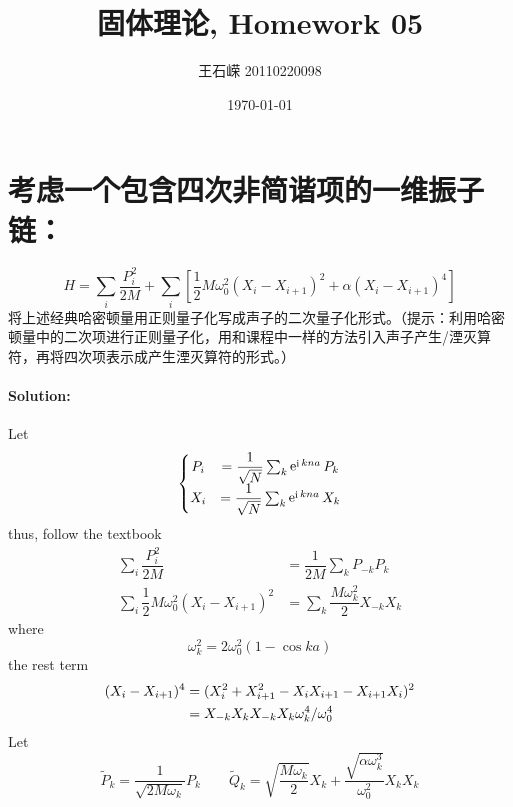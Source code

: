 \documentclass[a4paper]{article}
\title{固体理论, Homework 05}
\author{王石嵘 20110220098}
\date{\today} %
\DeclareMathOperator{\e}{\mathrm{e}}
\DeclareMathOperator{\I}{\mathrm{i}}
\numberwithin{equation}{section}
\begin{document}
\maketitle





\section{
考虑一个包含四次非简谐项的一维振子链：}
\begin{equation}\label{key}
	 H = \sum_i\dfrac{P_i^2}{2M} + \sum_i \left[\dfrac{1}{2}M\omega_0^2(X_i-X_{i+1})^2 + \alpha(X_i-X_{i+1})^4 \right]
\end{equation}
将上述经典哈密顿量用正则量子化写成声子的二次量子化形式。（提示：利用哈密顿量中的二次项进行正则量子化，用和课程中一样的方法引入声子产生/湮灭算符，再将四次项表示成产生湮灭算符的形式。）
\paragraph{Solution:}
Let
\begin{equation}\label{key}
	\left\{ 
	\mqty{P_i &= \dfrac{1}{\sqrt{N}} \sum_k \e^{\I k n a} P_k\\
	X_i &= \dfrac{1}{\sqrt{N}} \sum_k \e^{\I k n a} X_k
} \right.
\end{equation}
thus, follow the textbook
\begin{align}
	\sum_i\dfrac{P_i^2}{2M} &= \dfrac{1}{2M}\sum_k P_{-k} P_k \\
	\sum_i \dfrac{1}{2}M\omega_0^2(X_i-X_{i+1})^2 &= \sum_k \dfrac{M\omega_k^2}{2} X_{-k}X_k
\end{align}
where
\begin{equation}\label{key}
	\omega_k^2 = 2\omega_0^2 (1 - \cos ka)
\end{equation}
the rest term
\begin{align}
	(X_i-X_{i+1})^4 &= (X_i^2 + X_{i+1}^2 - X_iX_{i+1} - X_{i+1}X_i)^2 \notag\\
	&= X_{-k}X_k X_{-k}X_k \omega_k^4/\omega_0^4
\end{align}
Let
\begin{equation}\label{key}
	\tilde{P}_k = \dfrac{1}{\sqrt{2M\omega_k}} P_k \qquad \tilde{Q}_k = \sqrt{\dfrac{M\omega_k}{2}}X_k +  \dfrac{\sqrt{\alpha\omega_k^3}}{\omega_0^2}X_k X_k
\end{equation}
\end{document}
